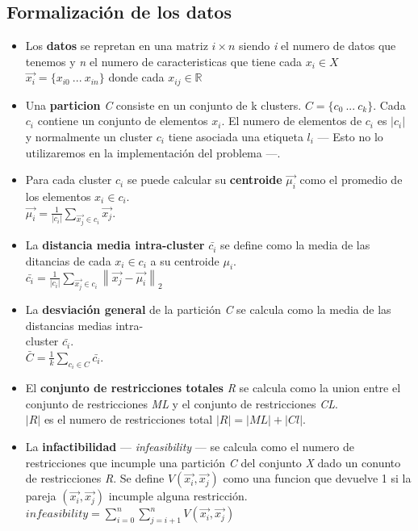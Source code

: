 \subsection{Formalización de los datos}
\begin{itemize}
   \item Los \textbf{datos} se repretan en una matriz $ i \times n $ siendo \emph{i} el numero de datos que tenemos y \emph{n} el numero de caracteristicas que tiene cada $ x_{i} \in X $ \\
   $ \vec{x_{i}} = \{x_{i0}\ ...\ x_{in}\} $ donde cada $ x_{ij} \in \mathbb{R} $
   \item Una \textbf{particion} \emph{C} consiste en un conjunto de k clusters. $ C = \{c_{0}\ ...\ c_{k}\} $. Cada $ c_{i} $ contiene un conjunto de elementos $ x_{i} $. El numero de elementos de $ c_{i} $ es $ \left | c_{i} \right | $ y normalmente un cluster $ c_{i} $ tiene asociada una etiqueta $ l_{i} $ --- Esto no lo utilizaremos en la implementación del problema ---.
   \item Para cada cluster $ c_{i} $ se puede calcular su \textbf{centroide} $ \vec{\mu_{i}} $ como el promedio de los elementos $ x_{i} \in c_{i} $.\\
   $ \vec{\mu_{i}} = \frac{1}{\left | c_{i} \right |}\sum_{\vec{x_{j}} \in c_{i}} \vec{x_{j}} $.
   \item La \textbf{distancia media intra-cluster} $ \bar{c_{i}} $ se define como la media de las ditancias de cada $ x_{i} \in c_{i} $ a su centroide $ \mu_{i} $.\\
   $ \bar{c_{i}} = \frac{1}{\left | c_{i} \right |}\sum_{\vec{x_{j}} \in c_{i}} \left \| \vec{x_{j}} - \vec{\mu_{i}} \right \|_{2} $
   \item La \textbf{desviación general} de la partición \emph{C} se calcula como la media de las distancias medias intra-\\cluster $ \bar{c_{i}} $.\\
   $ \bar{C} = \frac{1}{k}\sum_{c_{i} \in C} \bar{c_i} $.
   \item El \textbf{conjunto de restricciones totales} \emph{R} se calcula como la union entre el conjunto de restricciones \emph{ML} y el conjunto de restricciones \emph{CL}.\\
   $ \left | R \right | $ es el numero de restricciones total $ \left | R \right | = \left | ML \right | + \left | Cl \right | $.
   \item La \textbf{infactibilidad} --- \emph{infeasibility} --- se calcula como el numero de restricciones que incumple una partición \emph{C} del conjunto \emph{X} dado un conunto de restricciones \emph{R}. Se define $ V(\vec{x_{i}},\vec{x_{j}}) $ como una funcion que devuelve 1 si la pareja $ (\vec{x_{i}},\vec{x_{j}}) $ incumple alguna restricción.\\
   $ infeasibility = \sum_{i=0}^{n} \sum_{j=i+1}^{n} V(\vec{x_{i}},\vec{x_{j}}) $

\end{itemize}

